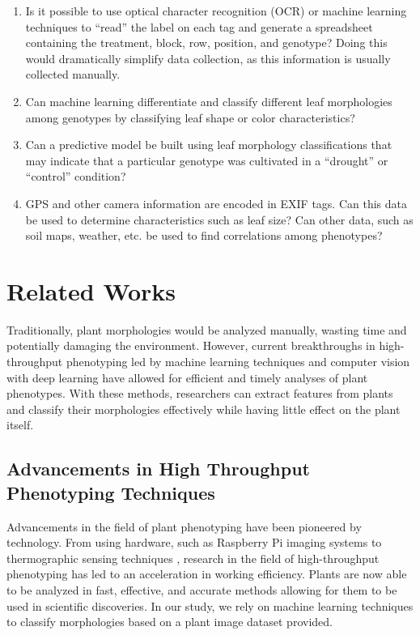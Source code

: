 \documentclass[final,5p,times,twocolumn,authoryear]{elsarticle}
\begin{document}
\begin{enumerate}

\item Is it possible to use optical character recognition (OCR) or machine learning techniques to “read” the label on each tag and generate a spreadsheet containing the treatment, block, row, position, and genotype? Doing this would dramatically simplify data collection, as this information is usually collected manually.

\item Can machine learning differentiate and classify different leaf morphologies among genotypes by classifying leaf shape or color characteristics?

\item Can a predictive model be built using leaf morphology classifications that may indicate that a particular genotype was cultivated in a “drought” or “control” condition?

\item GPS and other camera information are encoded in EXIF tags. Can this data be used to determine characteristics such as leaf size? Can other data, such as soil maps, weather, etc. be used to find correlations among phenotypes?

\end{enumerate}

\section{Related Works}
\label{related_works}

Traditionally, plant morphologies would be analyzed manually, wasting time and potentially damaging the environment. However, current breakthroughs in high-throughput phenotyping led by machine learning techniques \citep{koh2021automated, pound2017deep} and computer vision with deep learning \citep{mochida2019computer} have allowed for efficient and timely analyses of plant phenotypes. With these methods, researchers can extract features from plants and classify their morphologies effectively while having little effect on the plant itself.

\subsection{Advancements in High Throughput Phenotyping Techniques}
\label{related_works_1}

Advancements in the field of plant phenotyping have been pioneered by technology. From using hardware, such as Raspberry Pi imaging systems \citep{tausen2020greenotyper} to thermographic sensing techniques \citep{walter2015plant}, research in the field of high-throughput phenotyping has led to an acceleration in working efficiency. Plants are now able to be analyzed in fast, effective, and accurate methods allowing for them to be used in scientific discoveries. In our study, we rely on machine learning techniques to classify morphologies based on a plant image dataset provided.
\end{document}
